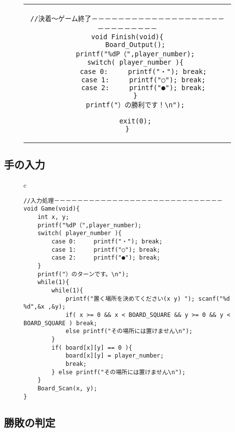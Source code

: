 \documentclass[uplatex,a4paper,11pt,oneside,openany]{jsbook}
\begin{document}
\begin{figure}[H]
  \centering
    \begin{tabular}{c}
\begin{minipage}{1.0\hsize}
  \centering
\begin{lstlisting}[caption=結果の表示：連珠（五目並べ）,label=prog8]
//決着～ゲーム終了－－－－－－－－－－－－－－－－－－－－－－－－－－－－－
void Finish(void){
    Board_Output();
    printf("%dP（",player_number);
    switch( player_number ){
        case 0:     printf("・"); break;
        case 1:     printf("○"); break;
        case 2:     printf("●"); break;
    }
    printf("）の勝利です！\n");

    exit(0);
}
\end{lstlisting}
\end{minipage}
\end{tabular}
\end{figure}

\subsection{手の入力}

\begin{figure}[H]
  \centering
    \begin{tabular}{c}
\begin{minipage}{1.0\hsize}
  \centering
\begin{lstlisting}[caption=入力処理：連珠（五目並べ）,label=prog8]
//入力処理－－－－－－－－－－－－－－－－－－－－－－－－－－－－－
void Game(void){
    int x, y;
    printf("%dP（",player_number);
    switch( player_number ){
        case 0:     printf("・"); break;
        case 1:     printf("○"); break;
        case 2:     printf("●"); break;
    }
    printf("）のターンです。\n");
    while(1){
        while(1){
            printf("置く場所を決めてください(x y) "); scanf("%d %d",&x ,&y);
            if( x >= 0 && x < BOARD_SQUARE && y >= 0 && y < BOARD_SQUARE ) break;
            else printf("その場所には置けません\n");
        }
        if( board[x][y] == 0 ){
            board[x][y] = player_number;
            break;
        } else printf("その場所には置けません\n");
    }
    Board_Scan(x, y);
}
\end{lstlisting}
\end{minipage}
\end{tabular}
\end{figure}

\subsection{勝敗の判定}
\end{document}
